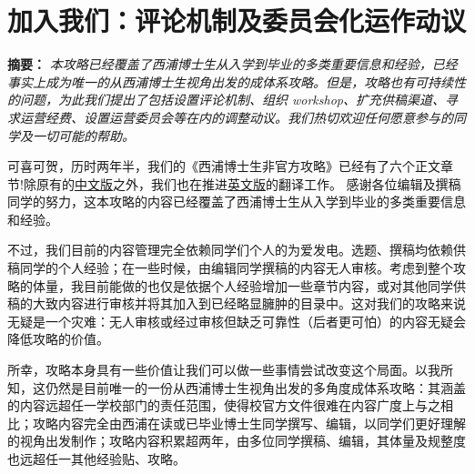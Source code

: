 \section{加入我们：评论机制及委员会化运作动议}
\textbf{摘要：} \textit{本攻略已经覆盖了西浦博士生从入学到毕业的多类重要信息和经验，已经事实上成为唯一的从西浦博士生视角出发的成体系攻略。但是，攻略也有可持续性的问题，为此我们提出了包括设置评论机制、组织 workshop、扩充供稿渠道、寻求运营经费、设置运营委员会等在内的调整动议。我们热切欢迎任何愿意参与的同学及一切可能的帮助。}

可喜可贺，历时两年半，我们的《西浦博士生非官方攻略》已经有了六个正文章节!除原有的\href{https://github.com/xp-pgrs-unofficial-guide/xp_pgrs_unofficial_guide/releases}{中文版}之外，我们也在推进\href{https://github.com/xp-pgrs-unofficial-guide/xp_pgrs_unofficial_guide_EN/releases}{英文版}的翻译工作。
感谢各位编辑及撰稿同学的努力，这本攻略的内容已经覆盖了西浦博士生从入学到毕业的多类重要信息和经验。

不过，我们目前的内容管理完全依赖同学们个人的为爱发电。选题、撰稿均依赖供稿同学的个人经验；在一些时候，由编辑同学撰稿的内容无人审核。考虑到整个攻略的体量，我目前能做的也仅是依据个人经验增加一些章节内容，或对其他同学供稿的大致内容进行审核并将其加入到已经略显臃肿的目录中。这对我们的攻略来说无疑是一个灾难：无人审核或经过审核但缺乏可靠性（后者更可怕）的内容无疑会降低攻略的价值。

所幸，攻略本身具有一些价值让我们可以做一些事情尝试改变这个局面。以我所知，这仍然是目前唯一的一份从西浦博士生视角出发的多角度成体系攻略：其涵盖的内容远超任一学校部门的责任范围，使得校官方文件很难在内容广度上与之相比；攻略内容完全由西浦在读或已毕业博士生同学撰写、编辑，以同学们更好理解的视角出发制作；攻略内容积累超两年，由多位同学撰稿、编辑，其体量及规整度也远超任一其他经验贴、攻略。

\vspace{5mm}

